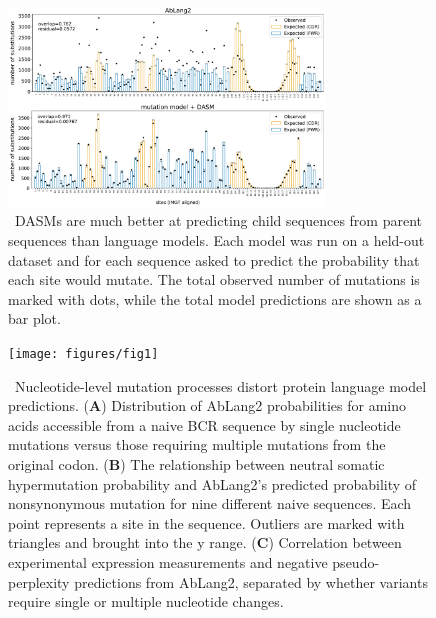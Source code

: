 \documentclass{article}
\begin{document}
\begin{figure}[ht]
\centering
\centerline{\includegraphics[width=0.75\textwidth]{figures/sites-oe-rodriguez}}
\caption{\
DASMs are much better at predicting child sequences from parent sequences than language models.
Each model was run on a held-out dataset and for each sequence asked to predict the probability that each site would mutate.
The total observed number of mutations is marked with dots, while the total model predictions are shown as a bar plot.
}%
\label{fig:selFactorsAndPerplexity}
\end{figure}

\begin{figure}[h!]
\centering
\centerline{\texttt{[image: figures/fig1]}}
\caption{\
Nucleotide-level mutation processes distort protein language model predictions.
(\textbf{A}) Distribution of AbLang2 probabilities for amino acids accessible from a naive BCR sequence by single nucleotide mutations versus those requiring multiple mutations from the original codon.
(\textbf{B}) The relationship between neutral somatic hypermutation probability and AbLang2's predicted probability of nonsynonymous mutation for nine different naive sequences. Each point represents a site in the sequence.
Outliers are marked with triangles and brought into the y range.
(\textbf{C}) Correlation between experimental expression measurements and negative pseudo-perplexity predictions from AbLang2, separated by whether variants require single or multiple nucleotide changes.
}%
\label{fig:ntProcessInLLMs}
\end{figure}
\end{document}
